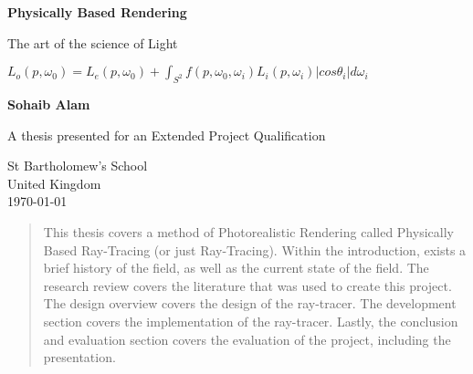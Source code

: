\documentclass[12pt, a4paper, english, twocolumn]{article}
\numberwithin{equation}{section}
\numberwithin{figure}{section}
\numberwithin{table}{section}
\begin{document}
\begin{titlepage}
   \begin{center}
       \vspace*{1cm}

       \textbf{Physically Based Rendering}

       \vspace{0.5cm}
        The art of the science of Light

        $ L_{o}(p, \omega_{0}) = L_{e}(p, \omega_{0}) + \displaystyle\int_{S^2}^{} f(p, \omega_{0}, \omega_{i}) L_{i}(p, \omega_{i}) |cos \theta_{i}|d \omega_{i} $
            
       \vspace{1.5cm}

       \textbf{Sohaib Alam}

       \vfill
            
       A thesis presented for an Extended Project Qualification
            
       \vspace{0.8cm}
     
            
       St Bartholomew's School\\
       United Kingdom\\
       \today
            
   \end{center}

\end{titlepage}


\onecolumn
\tableofcontents

\newpage

\begin{abstract}
This thesis covers a method of Photorealistic Rendering called Physically Based Ray-Tracing (or just Ray-Tracing). Within the introduction, 
exists a brief history of the field, as well as the current state of the field. The research review covers the literature that was used to
create this project. The design overview covers the design of the ray-tracer. The development section covers the implementation of the ray-tracer.
Lastly, the conclusion and evaluation section covers the evaluation of the project, including the presentation.
\end{abstract}

\twocolumn








\cleardoublepage
\printbibliography[heading=bibintoc]
\onecolumn

\end{document}
